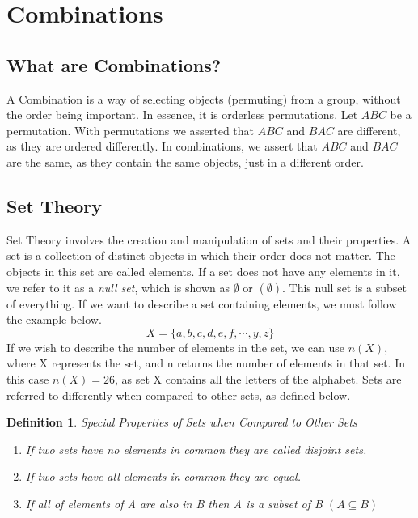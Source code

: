 \documentclass[final,1p,12pt]{elsarticle}
\newtheorem{definition}{Definition}
\begin{document}
\section{Combinations}

    \subsection{What are Combinations?}
     A Combination is a way of selecting objects (permuting) from a group, without the order being important.
     In essence, it is orderless permutations. Let $ABC$ be a permutation.
     With permutations we asserted that $ABC$ and $BAC$ are different, as they are ordered differently.
     In combinations, we assert that $ABC$ and $BAC$ are the same, as they contain the same objects, just in a different order.

    \subsection{Set Theory}
    Set Theory involves the creation and manipulation of sets and their properties.
    A set is a collection of distinct objects in which their order does not matter.
    The objects in this set are called elements.
    If a set does not have any elements in it, we refer to it as a \emph{null set}, which is shown as $\emptyset$ or $(\emptyset)$.
    This null set is a subset of everything.
    If we want to describe a set containing elements, we must follow the example below.
    \begin{equation*}
        X = \{a,b,c,d,e,f,\cdots,y,z\}
    \end{equation*}
    If we wish to describe the number of elements in the set, we can use $n(X)$, where X represents the set, and n returns the number of elements in that set.
    In this case $n(X) = 26$, as set X contains all the letters of the alphabet.
    Sets are referred to differently when compared to other sets, as defined below.
    \begin{definition}
    Special Properties of Sets when Compared to Other Sets
    \begin{enumerate}
        \item If two sets have no elements in common they are called disjoint sets.
        \item If two sets have all elements in common they are equal.
        \item If all of elements of A are also in B then A is a subset of B $(A\subseteq B)$
    \end{enumerate}
    \end{definition}
    
\end{document}
